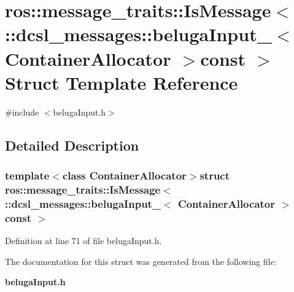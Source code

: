 \section{ros\-:\-:message\-\_\-traits\-:\-:\-Is\-Message$<$ \-:\-:dcsl\-\_\-messages\-:\-:beluga\-Input\-\_\-$<$ \-Container\-Allocator $>$const $>$ \-Struct \-Template \-Reference}
\label{structros_1_1message__traits_1_1IsMessage_3_01_1_1dcsl__messages_1_1belugaInput___3_01ContainerAllocator_01_4const_01_01_4}


{\ttfamily \#include $<$beluga\-Input.\-h$>$}



\subsection{\-Detailed \-Description}
\subsubsection*{template$<$class Container\-Allocator$>$struct ros\-::message\-\_\-traits\-::\-Is\-Message$<$ \-::dcsl\-\_\-messages\-::beluga\-Input\-\_\-$<$ Container\-Allocator $>$const  $>$}



\-Definition at line 71 of file beluga\-Input.\-h.



\-The documentation for this struct was generated from the following file\-:\begin{DoxyCompactItemize}
\item 
{\bf beluga\-Input.\-h}\end{DoxyCompactItemize}
